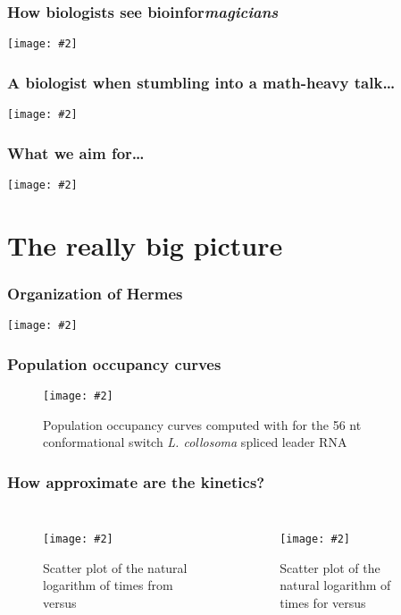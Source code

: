 \documentclass{beamer}
\newcommand{\slidefigure}[2][1]{\centering\texttt{[image: \#2]}}
\begin{document}
\begin{frame}
	\frametitle{How biologists see bioinfor{\em magicians}}
	\slidefigure{nemo}
\end{frame}

\begin{frame}
	\frametitle{A biologist when stumbling into a math-heavy talk\dots}
	\slidefigure{nemofocus}
\end{frame}

\begin{frame}
	\frametitle{What we aim for\dots}
	\slidefigure{nemoturtle}
\end{frame}

\section{The really big picture}

\begin{frame}
  \frametitle{Organization of Hermes}
  \slidefigure{Figures/Hermes/softwareOrg}
\end{frame}

\begin{frame}
  \frametitle{Population occupancy curves}
  \begin{figure}
    \slidefigure[.75]{Figures/Hermes/populationOccupancyCurves}
    \caption{Population occupancy curves computed with \ffteq for the 56 nt conformational switch {\em L. collosoma} spliced leader RNA}
  \end{figure}
\end{frame}

\begin{frame}
  \frametitle{How approximate are the kinetics?}
  \begin{columns}
    \begin{figure}
      \slidefigure{Figures/Hermes/rnaMfptHastingsKinfold}
      \caption{Scatter plot of the natural logarithm of times from \rnamfpt versus \kinfold}
    \end{figure}

    \begin{figure}
      \slidefigure{Figures/Hermes/rnaMfptHastingsFftMfptHastings}
      \caption{Scatter plot of the natural logarithm of times for \rnamfpt versus \fftmfpt}
    \end{figure}
  \end{columns}
\end{frame}
\end{document}
